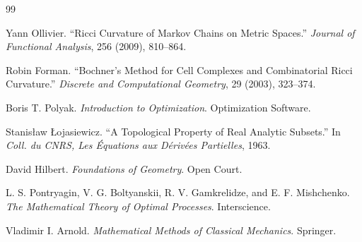 \documentclass[11pt]{book}
\numberwithin{equation}{chapter}
\theoremstyle{definition}
\theoremstyle{plain}
\begin{document}
\begin{thebibliography}{99}

Yann Ollivier.
``Ricci Curvature of Markov Chains on Metric Spaces.''
\textit{Journal of Functional Analysis},
256 (2009), 810--864.

Robin Forman.
``Bochner's Method for Cell Complexes and Combinatorial Ricci Curvature.''
\textit{Discrete and Computational Geometry},
29 (2003), 323--374.


Boris T. Polyak.
\textit{Introduction to Optimization}.
Optimization Software.

Stanisław Łojasiewicz.
``A Topological Property of Real Analytic Subsets.''
In \textit{Coll. du CNRS, Les Équations aux Dérivées Partielles},
1963.


David Hilbert.
\textit{Foundations of Geometry}.
Open Court.

L. S. Pontryagin, V. G. Boltyanskii,
R. V. Gamkrelidze, and E. F. Mishchenko.
\textit{The Mathematical Theory of Optimal Processes}.
Interscience.

Vladimir I. Arnold.
\textit{Mathematical Methods of Classical Mechanics}.
Springer.

\end{thebibliography}
\end{document}
